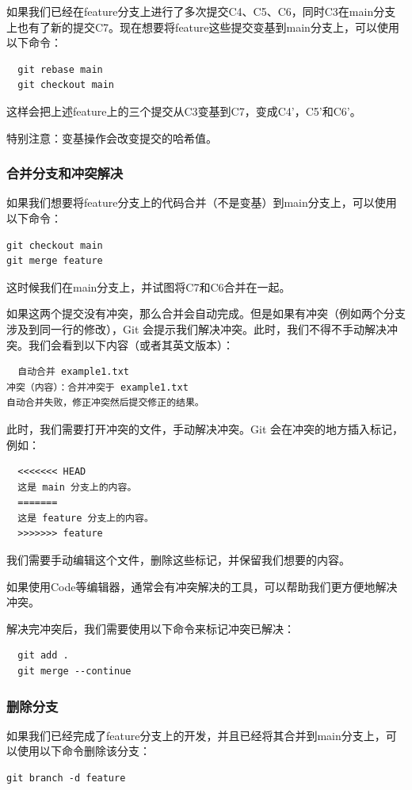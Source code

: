 \documentclass[../main.tex]{subfiles}
\begin{document}
如果我们已经在feature分支上进行了多次提交C4、C5、C6，同时C3在main分支上也有了新的提交C7。现在想要将feature这些提交变基到main分支上，可以使用以下命令：
\begin{verbatim}
  git rebase main
  git checkout main
\end{verbatim}
这样会把上述feature上的三个提交从C3变基到C7，变成C4'，C5'和C6'。

特别注意：变基操作会改变提交的哈希值。

\subsubsection{合并分支和冲突解决}

如果我们想要将feature分支上的代码合并（不是变基）到main分支上，可以使用以下命令：

\begin{verbatim}
git checkout main
git merge feature
\end{verbatim}

这时候我们在main分支上，并试图将C7和C6合并在一起。

如果这两个提交没有冲突，那么合并会自动完成。但是如果有冲突（例如两个分支涉及到同一行的修改），Git 会提示我们解决冲突。此时，我们不得不手动解决冲突。我们会看到以下内容（或者其英文版本）：
\begin{verbatim}
  自动合并 example1.txt
冲突（内容）：合并冲突于 example1.txt
自动合并失败，修正冲突然后提交修正的结果。
\end{verbatim}
此时，我们需要打开冲突的文件，手动解决冲突。Git 会在冲突的地方插入标记，例如：
\begin{verbatim}
  <<<<<<< HEAD
  这是 main 分支上的内容。
  =======
  这是 feature 分支上的内容。
  >>>>>>> feature
\end{verbatim}
我们需要手动编辑这个文件，删除这些标记，并保留我们想要的内容。

如果使用Code等编辑器，通常会有冲突解决的工具，可以帮助我们更方便地解决冲突。

解决完冲突后，我们需要使用以下命令来标记冲突已解决：
\begin{verbatim}
  git add .
  git merge --continue
\end{verbatim}

\subsubsection{删除分支}

如果我们已经完成了feature分支上的开发，并且已经将其合并到main分支上，可以使用以下命令删除该分支：
\begin{verbatim}
git branch -d feature
\end{verbatim}
\end{document}
